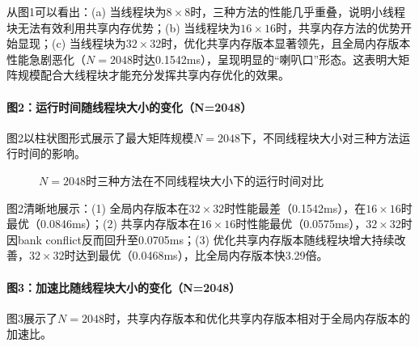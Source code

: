 \documentclass{SYSUReport}
\begin{document}
从图1可以看出：(a) 当线程块为$8\times8$时，三种方法的性能几乎重叠，说明小线程块无法有效利用共享内存优势；(b) 当线程块为$16\times16$时，共享内存方法的优势开始显现；(c) 当线程块为$32\times32$时，优化共享内存版本显著领先，且全局内存版本性能急剧恶化（$N=2048$时达0.1542ms），呈现明显的``喇叭口''形态。这表明大矩阵规模配合大线程块才能充分发挥共享内存优化的效果。

\paragraph{图2：运行时间随线程块大小的变化（N=2048）}

图2以柱状图形式展示了最大矩阵规模$N=2048$下，不同线程块大小对三种方法运行时间的影响。

\begin{figure}[H]
\centering
{}
\caption{$N=2048$时三种方法在不同线程块大小下的运行时间对比}
\label{fig:time-vs-block}
\end{figure}

图2清晰地展示：(1) 全局内存版本在$32\times32$时性能最差（0.1542ms），在$16\times16$时最优（0.0846ms）；(2) 共享内存版本在$16\times16$时性能最优（0.0575ms），$32\times32$时因bank conflict反而回升至0.0705ms；(3) 优化共享内存版本随线程块增大持续改善，$32\times32$时达到最优（0.0468ms），比全局内存版本快3.29倍。

\paragraph{图3：加速比随线程块大小的变化（N=2048）}

图3展示了$N=2048$时，共享内存版本和优化共享内存版本相对于全局内存版本的加速比。
\end{document}
